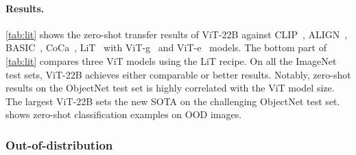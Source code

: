 \documentclass{article}
\newcommand{\chonk}{\mbox{ViT-22B}\xspace}
\begin{document}
\paragraph{Results.}
\cref{tab:lit} shows the zero-shot transfer results of \chonk against CLIP~\citep{clip}, ALIGN~\citep{align}, BASIC~\citep{basic}, CoCa~\citep{yu2022coca}, LiT~\citep{lit} with ViT-g~\citep{zhai2022scaling} and ViT-e~\citep{chen2022pali} models. 
The bottom part of \cref{tab:lit} compares three ViT models using the LiT recipe.
On all the ImageNet test sets, \chonk{} achieves either comparable or better results. 
Notably, zero-shot results on the ObjectNet test set is highly correlated with the ViT model size. 
The largest \chonk{} sets the new SOTA on the challenging ObjectNet test set.
 shows zero-shot classification examples on OOD images.


\begin{table}
\centering
\caption{Zero-shot transfer results on ImageNet (variants).}
\label{tab:lit}
\end{table}

\subsubsection{Out-of-distribution}
\label{subsec:robustness_ood}
\end{document}
